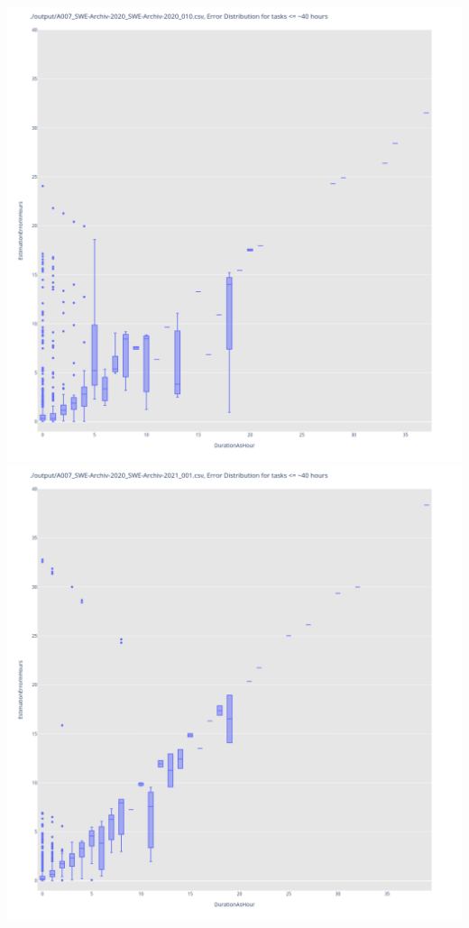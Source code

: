 \includegraphics[width=\textwidth]{Scripts/output/A007_SWE-Archiv-2020_SWE-Archiv-2020_010.csv.error_distribution.png}
\includegraphics[width=\textwidth]{Scripts/output/A007_SWE-Archiv-2020_SWE-Archiv-2021_001.csv.error_distribution.png}
